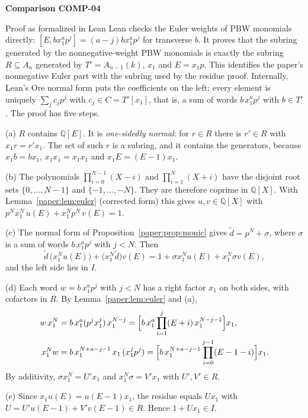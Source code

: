 \documentclass[11pt]{amsart}
\numberwithin{equation}{section}
\theoremstyle{plain}
\theoremstyle{remark}
\newcommand{\bbQ}{\mathbb{Q}}
\begin{document}
\par\bigskip\noindent{}\hypertarget{comparison-COMP-04}{\textbf{Comparison COMP-04}}\label{comparison-COMP-04}\par\smallskip
{}
\begin{AIaddition}{Proof as formalized in Lean}
Lean checks the Euler weights of PBW monomials directly:
$[E,bx_1^ap^j]=(a-j)bx_1^ap^j$ for transverse $b$.
It proves that the subring generated by the nonnegative-weight PBW monomials
is exactly the subring $R\subseteq A_n$ generated by
$T'=A_{n-1}(k)$, $x_1$ and $E=x_1p$. This identifies the paper's
nonnegative Euler part with the subring used by the residue proof.
Internally, Lean's Ore normal form puts the coefficients on the
left: every element is uniquely $\sum_jc_jp^j$ with $c_j\in C=T'[x_1]$, that
is, a sum of words $b\,x_1^ap^j$ with $b\in T'$. The proof has five steps.

(a) $R$ contains $\bbQ[E]$. It is \emph{one-sidedly normal}: for
$r\in R$ there is $r'\in R$ with $x_1r=r'x_1$. The set of such $r$ is a
subring, and it contains the generators, because $x_1b=bx_1$,
$x_1x_1=x_1x_1$ and $x_1E=(E-1)x_1$.

(b) The polynomials $\prod_{i=0}^{N-1}(X-i)$ and $\prod_{i=1}^{N}(X+i)$ have
the disjoint root sets $\{0,\ldots,N-1\}$ and $\{-1,\ldots,-N\}$. They are
therefore coprime in $\bbQ[X]$. With Lemma~\ref{paper:lem:euler} (corrected
form) this gives $u,v\in\bbQ[X]$ with
$p^Nx_1^N\,u(E)+x_1^Np^N\,v(E)=1$.

(c) The normal form of Proposition~\ref{paper:prop:monic} gives
$\tilde d=p^N+\sigma$, where $\sigma$ is a sum of words $b\,x_1^ap^j$ with
$j<N$. Then
\[
\tilde d\,\bigl(x_1^Nu(E)\bigr)+\bigl(x_1^N\tilde d\bigr)v(E)
=1+\sigma x_1^Nu(E)+x_1^N\sigma v(E),
\]
and the left side lies in $I$.

(d) Each word $w=b\,x_1^ap^j$ with $j<N$ has a right factor $x_1$ on both
sides, with cofactors in $R$. By Lemma~\ref{paper:lem:euler} and (a),
\begin{align*}
w\,x_1^N&=b\,x_1^a(p^jx_1^j)\,x_1^{N-j}
=\Bigl[b\,x_1^a\prod_{i=1}^{j}(E+i)\,x_1^{N-j-1}\Bigr]x_1,\\
x_1^Nw&=b\,x_1^{N+a-j-1}\,x_1\,(x_1^jp^j)
=\Bigl[b\,x_1^{N+a-j-1}\prod_{i=0}^{j-1}(E-1-i)\Bigr]x_1 .
\end{align*}
By additivity, $\sigma x_1^N=U'x_1$ and $x_1^N\sigma=V'x_1$ with
$U',V'\in R$.

(e) Since $x_1u(E)=u(E-1)x_1$, the residue equals $Ux_1$ with
$U=U'u(E-1)+V'v(E-1)\in R$. Hence $1+Ux_1\in I$.
\end{AIaddition}
\end{document}
